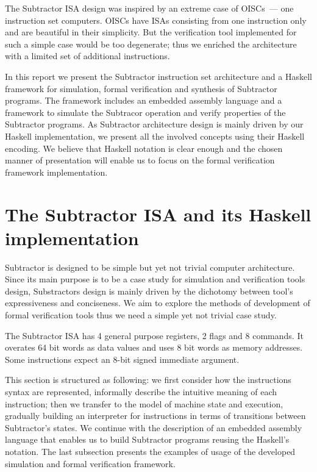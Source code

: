 The Subtractor ISA design was inspired by an extreme case of OISCs~--- one instruction set computers. OISCs have ISAs consisting from one instruction only and are beautiful in their simplicity. But the verification tool implemented for such a simple case would be too degenerate; thus we enriched the architecture with a limited set of additional instructions.

In this report we present the Subtractor instruction set architecture and a Haskell framework for simulation, formal verification and synthesis of Subtractor programs. The framework includes an embedded assembly language and a framework to simulate the Subtracor operation and verify properties of the Subtractor programs. As Subtractor architecture design is mainly driven by our Haskell implementation, we present all the involved concepts using their Haskell encoding. We believe that Haskell notation is clear enough and the chosen manner of presentation will enable us to focus on the formal verification framework implementation.

\section{The Subtractor ISA and its Haskell implementation}

Subtractor is designed to be simple but yet not trivial computer architecture. Since its main purpose is to be a case study for simulation and verification tools design, Substractors design is mainly driven by the dichotomy between tool's expressiveness and conciseness. We aim to explore the methods of development of formal verification tools thus we need a simple yet not trivial case study.

The Subtractor ISA has 4 general purpose registers, 2 flags and 8 commands. It overates 64 bit words as data values and uses 8 bit words as memory addresses. Some instructions expect an 8-bit signed immediate argument.

This section is structured as following: we first consider how the instructions syntax are represented, informally describe the intuitive meaning of each instruction; then we transfer to the model of machine state and execution, gradually building an interpreter for instructions in terms of transitions between Subtractor's states. We continue with the description of an embedded assembly language that enables us to build Subtractor programs reusing the Haskell's notation. The last subsection presents the examples of usage of the developed simulation and formal verification framework.

